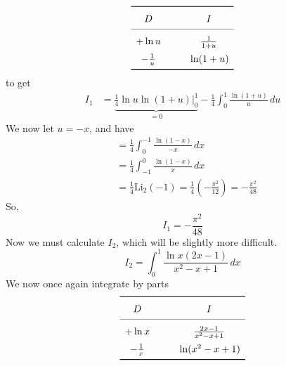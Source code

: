 \documentclass{article}
\newcommand{\tikzmark}[1]{%
    \tikz[overlay, remember picture, baseline] \node (#1) {};%
}
\begin{document}
\[
    \renewcommand{\arraystretch}{1.5}
    \begin{array}{c @{\hspace*{1.0cm}} c}\toprule
       D & I \\\cmidrule{1-2}
      +\ln{u}\tikzmark{Left 1} & \tikzmark{Right 1}\frac{1}{1+u} \\
      -\frac{1}{u} \tikzmark{Left 2} & \tikzmark{Right 2}\ln(1+u)  \\\bottomrule
    \end{array}
\]
%
%
to get \begin{equation*}
    \begin{split}
        I_1&= \underbrace{\frac{1}{4}\ln{u}\ln(1+u)\Big|_{0}^{1}}_{=0}-\frac{1}{4}\int_{0}^{1}\frac{\ln(1+u)}{u}\,du
    \end{split}
\end{equation*}
We now let $u=-x$, and have
\begin{equation*}
    \begin{split}
        &=\frac{1}{4}\int_{0}^{-1}\frac{\ln(1-x)}{-x}\,dx\\
        &=\frac{1}{4}\int_{-1}^{0}\frac{\ln(1-x)}{x}\,dx\\
        &=\frac{1}{4}\text{Li}_2(-1)=\frac{1}{4}\left(-\frac{\pi^2}{12}\right)=-\frac{\pi^2}{48}
    \end{split}
\end{equation*} \newpage
So,
\begin{equation}
    \boxed{I_1=-\frac{\pi^2}{48}}
\end{equation}
Now we must calculate $I_2$, which will be slightly more difficult.
\begin{equation*}
    I_2=\int_{0}^{1} \frac{\ln{x}(2x-1)}{x^2-x+1}\,dx
\end{equation*}
We now once again integrate by parts
\[
    \renewcommand{\arraystretch}{1.5}
    \begin{array}{c @{\hspace*{1.0cm}} c}\toprule
       D & I \\\cmidrule{1-2}
      +\ln{x}\tikzmark{Left 1} & \tikzmark{Right 1}\frac{2x-1}{x^2-x+1} \\
     - \frac{1}{x} \tikzmark{Left 2} & \tikzmark{Right 2}\ln(x^2-x+1)  \\\bottomrule
    \end{array}
\]
%
\end{document}
